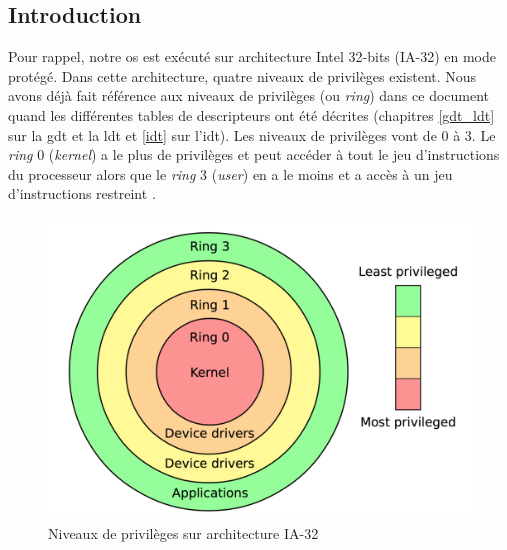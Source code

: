 \label{user}

\subsection{Introduction}
Pour rappel, notre \acrshort{os} est exécuté sur architecture Intel 32-bits (\acrshort{IA-32})
en mode protégé. Dans cette architecture, quatre niveaux de privilèges existent.
Nous avons déjà fait référence aux niveaux de privilèges (ou \textit{ring})
dans ce document quand les différentes tables de descripteurs ont été décrites
(chapitres \ref{gdt_ldt} sur la \acrshort{gdt} et la \acrshort{ldt} et \ref{idt}
sur l'\acrshort{idt}). Les niveaux de privilèges vont de 0 à 3. Le \textit{ring}
0 (\textit{kernel}) a le plus de privilèges et peut accéder à tout le jeu d'instructions
du processeur alors que le \textit{ring} 3 (\textit{user}) en a le moins et a accès
à un jeu d'instructions restreint \cite{ref42}.

\begin{figure}[!h]
  \centering
  \includegraphics[scale=.4]{images/rings.png}
  \caption{Niveaux de privilèges sur architecture \acrshort{IA-32}}
  \label{rings}
\end{figure}

